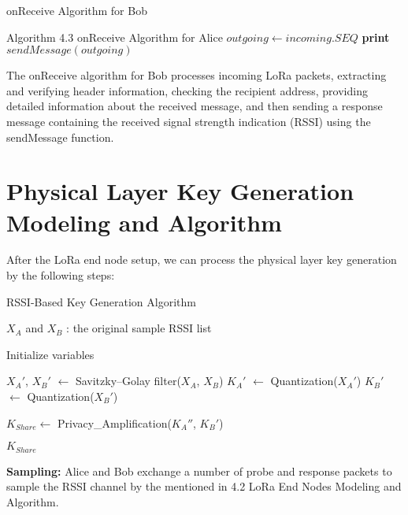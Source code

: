 \begin{algorithm}[hbt!]
  \caption{onReceive Algorithm for Bob}\label{alg:BobonReceive}
  \begin{algorithmic}
          \State Algorithm 4.3 onReceive Algorithm for Alice
          \State $outgoing \gets incoming.SEQ$
          \State \textbf{print} $sendMessage(outgoing)$
      \EndFunction
  \end{algorithmic}
\end{algorithm}
The onReceive algorithm for Bob processes incoming LoRa packets, extracting and verifying header information, checking the recipient address, providing detailed information about the received message, and then sending a response message containing the received signal strength indication (RSSI) using the sendMessage function.

\section{Physical Layer Key Generation Modeling and Algorithm}
After the LoRa end node setup, we can process the physical layer key generation by the following steps:
\begin{algorithm}[hbt!]
  \caption{RSSI-Based Key Generation Algorithm}\label{alg:keygeneration}
  \begin{algorithmic}
  
  \Require $X_A$ and $X_B$ :  the original sample RSSI list
  
  \State Initialize variables
  
  \State $X_A'$, $X_B'$ $\gets$ Savitzky–Golay filter($X_A$, $X_B$)
  \Repeat
      \State $K_A'$ $\gets$ Quantization($X_A'$)
      \State $K_B'$ $\gets$ Quantization($X_B'$)
  
  \State $K_{Share} \gets$ Privacy\_Amplification($K_A''$, $K_B'$)
  
  \State \Return $K_{Share}$ 
  
  \end{algorithmic}
\end{algorithm}

\textbf{Sampling:} Alice and Bob exchange a number of probe and response packets to sample the RSSI channel by the mentioned in 4.2 LoRa End Nodes Modeling and Algorithm.

